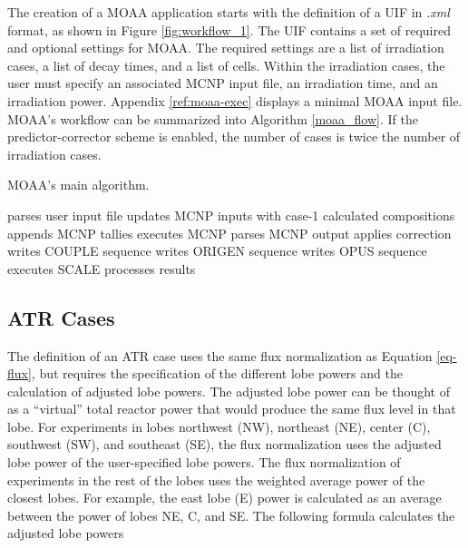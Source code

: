 The creation of a MOAA application starts with the definition of a \gls*{UIF} in \textit{.xml} format, as shown in Figure \ref{fig:workflow_1}.
The UIF contains a set of required and optional settings for MOAA.
The required settings are a list of irradiation cases, a list of decay times, and a list of cells.
Within the irradiation cases, the user must specify an associated MCNP input file, an irradiation time, and an irradiation power.
Appendix \ref{ref:moaa-exec} displays a minimal MOAA input file.
MOAA's workflow can be summarized into Algorithm \ref{moaa_flow}.
If the predictor-corrector scheme is enabled, the number of cases is twice the number of irradiation cases.

\begin{algorithm}
  \caption{MOAA's main algorithm.}
  \label{moaa_flow}
  \begin{algorithmic}[1]
    \State parses user input file
        \State updates MCNP inputs with case-1 calculated compositions  
      \EndIf
      \State appends MCNP tallies
      \State executes MCNP
      \State parses MCNP output
        \State applies correction
      \EndIf
      \State writes COUPLE sequence
      \State writes ORIGEN sequence
      \State writes OPUS sequence
      \State executes SCALE
      \State processes results
    \EndFor
  \end{algorithmic}
\end{algorithm}



\subsection{ATR Cases}
\label{sec:atr}

The definition of an ATR case uses the same flux normalization as Equation \ref{eq-flux}, but requires the specification of the different lobe powers and the calculation of adjusted lobe powers.
The adjusted lobe power can be thought of as a ``virtual'' total reactor power that would produce the same flux level in that lobe.
For experiments in lobes northwest (NW), northeast (NE), center (C), southwest (SW), and southeast (SE), the flux normalization uses the adjusted lobe power of the user-specified lobe powers.
The flux normalization of experiments in the rest of the lobes uses the weighted average power of the closest lobes.
For example, the east lobe (E) power is calculated as an average between the power of lobes NE, C, and SE.
The following formula calculates the adjusted lobe powers

